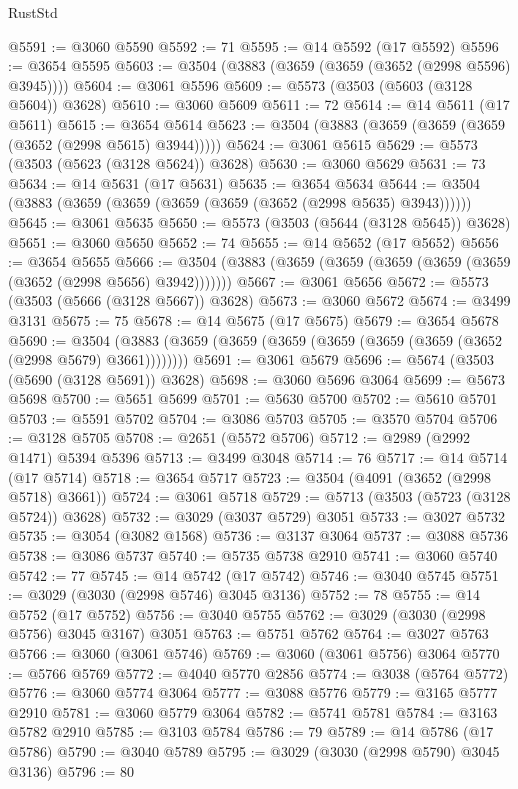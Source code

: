 \begin{lexlean}{RustStd}
\begin{coremodule}
@5591 := @3060 @5590
@5592 := 71
@5595 := @14 @5592 (@17 @5592)
@5596 := @3654 @5595
@5603 := @3504 (@3883 (@3659 (@3659 (@3652 (@2998 @5596) @3945))))
@5604 := @3061 @5596
@5609 := @5573 (@3503 (@5603 (@3128 @5604)) @3628)
@5610 := @3060 @5609
@5611 := 72
@5614 := @14 @5611 (@17 @5611)
@5615 := @3654 @5614
@5623 := @3504 (@3883 (@3659 (@3659 (@3659 (@3652 (@2998 @5615) @3944)))))
@5624 := @3061 @5615
@5629 := @5573 (@3503 (@5623 (@3128 @5624)) @3628)
@5630 := @3060 @5629
@5631 := 73
@5634 := @14 @5631 (@17 @5631)
@5635 := @3654 @5634
@5644 := @3504 (@3883 (@3659 (@3659 (@3659 (@3659 (@3652 (@2998 @5635) @3943))))))
@5645 := @3061 @5635
@5650 := @5573 (@3503 (@5644 (@3128 @5645)) @3628)
@5651 := @3060 @5650
@5652 := 74
@5655 := @14 @5652 (@17 @5652)
@5656 := @3654 @5655
@5666 := @3504 (@3883 (@3659 (@3659 (@3659 (@3659 (@3659 (@3652 (@2998 @5656) @3942)))))))
@5667 := @3061 @5656
@5672 := @5573 (@3503 (@5666 (@3128 @5667)) @3628)
@5673 := @3060 @5672
@5674 := @3499 @3131
@5675 := 75
@5678 := @14 @5675 (@17 @5675)
@5679 := @3654 @5678
@5690 := @3504 (@3883 (@3659 (@3659 (@3659 (@3659 (@3659 (@3659 (@3652 (@2998 @5679) @3661))))))))
@5691 := @3061 @5679
@5696 := @5674 (@3503 (@5690 (@3128 @5691)) @3628)
@5698 := @3060 @5696 @3064
@5699 := @5673 @5698
@5700 := @5651 @5699
@5701 := @5630 @5700
@5702 := @5610 @5701
@5703 := @5591 @5702
@5704 := @3086 @5703
@5705 := @3570 @5704
@5706 := @3128 @5705
@5708 := @2651 (@5572 @5706)
@5712 := @2989 (@2992 @1471) @5394 @5396
@5713 := @3499 @3048
@5714 := 76
@5717 := @14 @5714 (@17 @5714)
@5718 := @3654 @5717
@5723 := @3504 (@4091 (@3652 (@2998 @5718) @3661))
@5724 := @3061 @5718
@5729 := @5713 (@3503 (@5723 (@3128 @5724)) @3628)
@5732 := @3029 (@3037 @5729) @3051
@5733 := @3027 @5732
@5735 := @3054 (@3082 @1568)
@5736 := @3137 @3064
@5737 := @3088 @5736
@5738 := @3086 @5737
@5740 := @5735 @5738 @2910
@5741 := @3060 @5740
@5742 := 77
@5745 := @14 @5742 (@17 @5742)
@5746 := @3040 @5745
@5751 := @3029 (@3030 (@2998 @5746) @3045 @3136)
@5752 := 78
@5755 := @14 @5752 (@17 @5752)
@5756 := @3040 @5755
@5762 := @3029 (@3030 (@2998 @5756) @3045 @3167) @3051
@5763 := @5751 @5762
@5764 := @3027 @5763
@5766 := @3060 (@3061 @5746)
@5769 := @3060 (@3061 @5756) @3064
@5770 := @5766 @5769
@5772 := @4040 @5770 @2856
@5774 := @3038 (@5764 @5772)
@5776 := @3060 @5774 @3064
@5777 := @3088 @5776
@5779 := @3165 @5777 @2910
@5781 := @3060 @5779 @3064
@5782 := @5741 @5781
@5784 := @3163 @5782 @2910
@5785 := @3103 @5784
@5786 := 79
@5789 := @14 @5786 (@17 @5786)
@5790 := @3040 @5789
@5795 := @3029 (@3030 (@2998 @5790) @3045 @3136)
@5796 := 80

\end{coremodule}
\end{lexlean}
